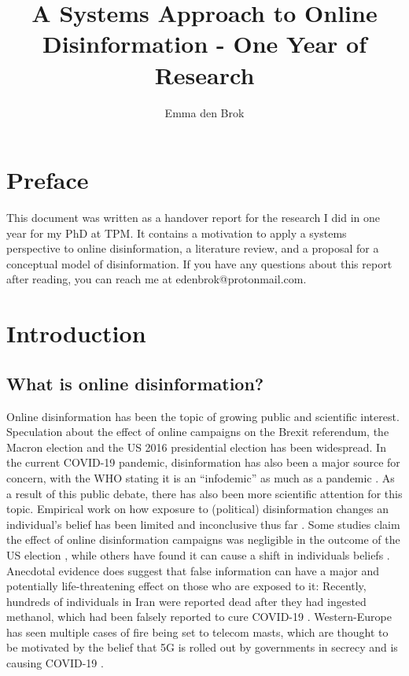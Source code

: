\documentclass[10pt,a4paper]{article}
\author{Emma den Brok}
\title{A Systems Approach to Online Disinformation - One Year of Research}
\begin{document}
	\maketitle
	
	\tableofcontents
	
\section{Preface}
This document was written as a handover report for the research I did in one year for my PhD at TPM. It contains a motivation to apply a systems perspective to online disinformation, a literature review, and a proposal for a conceptual model of disinformation. If you have any questions about this report after reading, you can reach me at edenbrok@protonmail.com.

\section{Introduction}
\subsection{What is online disinformation?}
Online disinformation has been the topic of growing public and scientific interest. Speculation about the effect of online campaigns on the Brexit referendum, the Macron election and the US 2016 presidential election has been widespread. In the current COVID-19 pandemic, disinformation has also been a major source for concern, with the WHO stating it is an “infodemic” as much as a pandemic \cite{WHO2020}.  As a result of this public debate, there has also been more scientific attention for this topic. Empirical work on how exposure to (political) disinformation changes an individual’s belief has been limited and inconclusive thus far \citep{Tucker2018}. Some studies claim the effect of online disinformation campaigns was negligible in the outcome of the US election \citep{Allcott2017}, while others have found it can cause a shift in individuals beliefs \citep{Guess2020}. Anecdotal evidence does suggest that false information can have a major and potentially life-threatening effect on those who are exposed to it: Recently, hundreds of individuals in Iran were reported dead after they had ingested methanol, which had been falsely reported to cure COVID-19 \citep{Stone2020, Trew2020}. Western-Europe has seen multiple cases of fire being set to telecom masts, which are thought to be motivated by the belief that 5G is rolled out by governments in secrecy and is causing COVID-19 \citep{DeStandaard2020, Fildes2020, NOS2020}. \\
\end{document}
